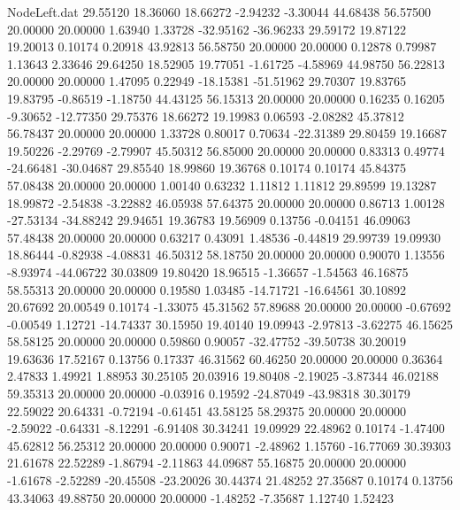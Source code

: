\begin{filecontents}{NodeLeft.dat}
  29.55120   18.36060   18.66272    -2.94232   -3.30044   44.68438   56.57500   20.00000   20.00000    1.63940    1.33728  -32.95162  -36.96233
  29.59172   19.87122   19.20013     0.10174    0.20918   43.92813   56.58750   20.00000   20.00000    0.12878    0.79987    1.13643    2.33646
  29.64250   18.52905   19.77051    -1.61725   -4.58969   44.98750   56.22813   20.00000   20.00000    1.47095    0.22949  -18.15381  -51.51962
  29.70307   19.83765   19.83795    -0.86519   -1.18750   44.43125   56.15313   20.00000   20.00000    0.16235    0.16205   -9.30652  -12.77350
  29.75376   18.66272   19.19983     0.06593   -2.08282   45.37812   56.78437   20.00000   20.00000    1.33728    0.80017    0.70634  -22.31389
  29.80459   19.16687   19.50226    -2.29769   -2.79907   45.50312   56.85000   20.00000   20.00000    0.83313    0.49774  -24.66481  -30.04687
  29.85540   18.99860   19.36768     0.10174    0.10174   45.84375   57.08438   20.00000   20.00000    1.00140    0.63232    1.11812    1.11812
  29.89599   19.13287   18.99872    -2.54838   -3.22882   46.05938   57.64375   20.00000   20.00000    0.86713    1.00128  -27.53134  -34.88242
  29.94651   19.36783   19.56909     0.13756   -0.04151   46.09063   57.48438   20.00000   20.00000    0.63217    0.43091    1.48536   -0.44819
  29.99739   19.09930   18.86444    -0.82938   -4.08831   46.50312   58.18750   20.00000   20.00000    0.90070    1.13556   -8.93974  -44.06722
  30.03809   19.80420   18.96515    -1.36657   -1.54563   46.16875   58.55313   20.00000   20.00000    0.19580    1.03485  -14.71721  -16.64561
  30.10892   20.67692   20.00549     0.10174   -1.33075   45.31562   57.89688   20.00000   20.00000   -0.67692   -0.00549    1.12721  -14.74337
  30.15950   19.40140   19.09943    -2.97813   -3.62275   46.15625   58.58125   20.00000   20.00000    0.59860    0.90057  -32.47752  -39.50738
  30.20019   19.63636   17.52167     0.13756    0.17337   46.31562   60.46250   20.00000   20.00000    0.36364    2.47833    1.49921    1.88953
  30.25105   20.03916   19.80408    -2.19025   -3.87344   46.02188   59.35313   20.00000   20.00000   -0.03916    0.19592  -24.87049  -43.98318
  30.30179   22.59022   20.64331    -0.72194   -0.61451   43.58125   58.29375   20.00000   20.00000   -2.59022   -0.64331   -8.12291   -6.91408
  30.34241   19.09929   22.48962     0.10174   -1.47400   45.62812   56.25312   20.00000   20.00000    0.90071   -2.48962    1.15760  -16.77069
  30.39303   21.61678   22.52289    -1.86794   -2.11863   44.09687   55.16875   20.00000   20.00000   -1.61678   -2.52289  -20.45508  -23.20026
  30.44374   21.48252   27.35687     0.10174    0.13756   43.34063   49.88750   20.00000   20.00000   -1.48252   -7.35687    1.12740    1.52423

\end{filecontents}
